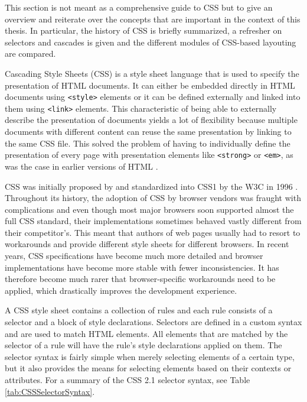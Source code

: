 This section is not meant as a comprehensive guide to CSS but to give an overview and reiterate over the concepts that are important in the context of this thesis.
In particular, the history of CSS is briefly summarized, a refresher on selectors and cascades is given and the different modules of CSS-based layouting are compared.

Cascading Style Sheets (CSS) is a style sheet language that is used to specify the presentation of HTML documents. 
It can either be embedded directly in HTML documents using \lstinline{<style>} elements or it can be defined externally and linked into them using \lstinline{<link>} elements. 
This characteristic of being able to externally describe the presentation of documents yields a lot of flexibility because multiple documents with different content can reuse the same presentation by linking to the same CSS file. 
This solved the problem of having to individually define the presentation of every page with presentation elements like \lstinline{<strong>} or \lstinline{<em>}, as was the case in earlier versions of HTML \parencite{HTML32}.

CSS was initially proposed by \cite{CSSProposal} and standardized into CSS1 by the W3C in 1996 \parencite{CSS1}. 
Throughout its history, the adoption of CSS by browser vendors was fraught with complications and even though most major browsers soon supported almost the full CSS standard, their implementations sometimes behaved vastly different from their competitor's. 
This meant that authors of web pages usually had to resort to workarounds and provide different style sheets for different browsers. 
In recent years, CSS specifications have become much more detailed \parencite{CSS21} and browser implementations have become more stable with fewer inconsistencies. 
It has therefore become much rarer that browser-specific workarounds need to be applied, which
drastically improves the development experience.

A CSS style sheet contains a collection of rules and each rule consists of a selector and a block of style declarations. 
Selectors are defined in a custom syntax and are used to match HTML elements. 
All elements that are matched by the selector of a rule will have the rule's style declarations applied on them. 
The selector syntax is fairly simple when merely selecting elements of a certain type, but it also provides the means for selecting elements based on their contexts or attributes. 
For a summary of the CSS 2.1 selector syntax, see Table \ref{tab:CSSSelectorSyntax}.

